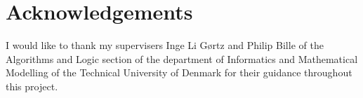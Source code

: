 \chapter{Acknowledgements}

I would like to thank my supervisers Inge Li Gørtz
and Philip Bille
of the Algorithms and Logic section of the department of Informatics and
Mathematical Modelling of the Technical University of Denmark for their guidance
throughout this project.
